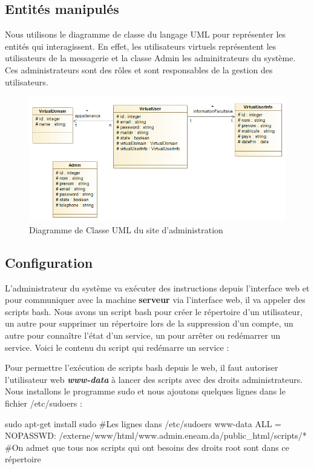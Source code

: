 \documentclass[a4paper,12pt,french]{report} %
\begin{document}
\subsection*{Entités manipulés}
Nous utilisons le diagramme de classe du langage UML pour représenter les entités qui interagissent.
En effet, les utilisateurs virtuels représentent les utilisateurs de la messagerie et la classe Admin les adminitrateurs du système. Ces administrateurs sont des rôles et sont responsables de la gestion des utilisateurs.
\begin{figure}[H]
	\centering
	\includegraphics[scale=0.5]{figure/diagram-class.png}
	\caption{Diagramme de Classe UML du site d'administration}
\end{figure}
\subsection*{Configuration}
L'administrateur du système va exécuter des instructions depuis l'interface web et pour communiquer avec la machine \textbf{serveur} via l'interface web, il va appeler des scripts bash. Nous avons un script bash pour créer le répertoire d'un utilisateur, un autre pour supprimer un répertoire lors de la suppression d'un compte, un autre pour connaître l'état d'un service, un pour arrêter ou redémarrer un service. Voici le contenu du script qui redémarre un service :

Pour permettre l'exécution de scripts bash depuis le web, il faut autoriser l'utilisateur web \emph{\textbf{www-data}} à lancer des scripts avec des droits administrateurs. Nous installons le programme sudo et nous ajoutons quelques lignes dans le fichier /etc/sudoers :
\begin{exempleConsole}
sudo apt-get install sudo 
#Les lignes dans /etc/sudoers
www-data ALL = NOPASSWD: /externe/www/html/www.admin.eneam.da/public_html/scripts/*
#On admet que tous nos scripts qui ont besoins des droits root sont dans ce répertoire	
\end{exempleConsole}
\end{document}
